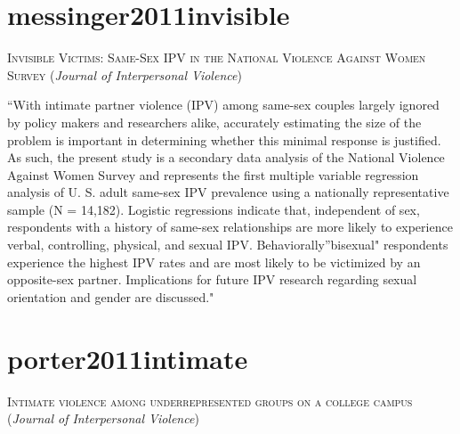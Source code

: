 \documentclass[]{tufte-handout}
\begin{document}
\section{\texorpdfstring{\textcolor[HTML]{5b0057}{messinger2011invisible}}{}}\label{section-46}

\textsc{\large{Invisible Victims: Same-Sex IPV in the National Violence Against Women Survey}}
(\emph{Journal of Interpersonal Violence})

``With intimate partner violence (IPV) among same-sex couples largely
ignored by policy makers and researchers alike, accurately estimating
the size of the problem is important in determining whether this minimal
response is justified. As such, the present study is a secondary data
analysis of the National Violence Against Women Survey and represents
the first multiple variable regression analysis of U. S. adult same-sex
IPV prevalence using a nationally representative sample (N = 14,182).
Logistic regressions indicate that, independent of sex, respondents with
a history of same-sex relationships are more likely to experience
verbal, controlling, physical, and sexual IPV. Behaviorally''bisexual"
respondents experience the highest IPV rates and are most likely to be
victimized by an opposite-sex partner. Implications for future IPV
research regarding sexual orientation and gender are discussed."

\section{\texorpdfstring{\textcolor[HTML]{5b0057}{porter2011intimate}}{}}\label{section-47}

\textsc{\large{Intimate violence among underrepresented groups on a college campus}}
(\emph{Journal of Interpersonal Violence})
\end{document}
